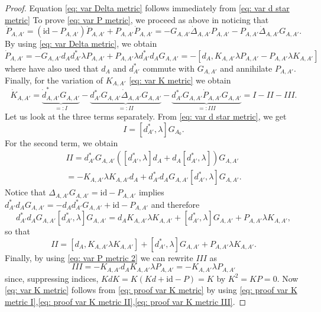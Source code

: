 \documentclass[11pt,a4paper]{amsart}
\theoremstyle{plain} %
\theoremstyle{definition}
\theoremstyle{remark}
\newcommand{\dd}{d}
\newcommand{\mr}{\mathrm}
\begin{document}
\begin{proof}
     Equation \eqref{eq: var Delta metric} follows immediately from \eqref{eq: var d star metric}
    To prove \eqref{eq: var P metric}, we proceed as above in noticing that 
    \begin{equation}
        \dot{P}_{A,A'} = (\mr{id}- P_{A,A'})\dot{P}_{A,A'} + P_{A,A'}\dot{P}_{A,A'} =  - G_{A,A'}\dot{\Delta}_{A,A'} P_{A,A'} - P_{A,A'}\dot{\Delta}_{A,A'}G_{A,A'}.
    \end{equation}
    By using \eqref{eq: var Delta metric}, we obtain 
    \begin{equation} \label{eq: var P metric 2}
        \dot{P}_{A,A'} = - G_{A,A'} \dd_A\dd^*_{A'}\lambda P_{A,A'} + P_{A,A'} \lambda \dd^*_{A'}\dd_AG_{A,A'} = - [\dd_A, K_{A,A'}\lambda P_{A,A'} - P_{A,A'}\lambda K_{A,A'}]
    \end{equation}
    where have also used that $\dd_A$ and $\dd^*_{A'}$ commute with $G_{A,A'}$ and annihilate $P_{A,A'}$. 
    Finally, for the variation of $K_{A,A'}$ \eqref{eq: var K metric}  we obtain 
    \begin{equation}
        \dot{K}_{A,A'} = \underbrace{\dot{d}^*_{A,A'}G_{A,A'}}_{=:I} - \underbrace{\dd^*_{A'}G_{A,A'}\dot{\Delta}_{A,A'}G_{A,A'}}_{=:II} -\underbrace{\dd^*_{A'}G_{A,A'}\dot{P}_{A,A'}G_{A,A'}}_{=:III} = I - II - III. \label{eq: proof var K metric}
    \end{equation}
    Let us look at the three terms separately. From \eqref{eq: var d star metric}, we get 
    \begin{equation}
        I = [\dd^*_{A'},\lambda] G_{A_{0}}. \label{eq: proof var K metric I}
    \end{equation}
    For the second term, we obtain
    \begin{multline}
        II = \dd^*_{A'}G_{A,A'}
        ([\dd^*_{A'},\lambda]\dd_A + \dd_A[\dd^*_{A'},\lambda])
        G_{A,A'} \\
        = -K_{A,A'}\lambda K_{A,A'}\dd_A + \dd^*_{A'}\dd_AG_{A,A'}[\dd^*_{A'},\lambda]G_{A,A'} \label{eq: proof var K metric II}.
    \end{multline}
    Notice that $\Delta_{A,A'}G_{A,A'} = \mr{id} - P_{A,A'}$ implies $\dd^*_{A'}\dd_AG_{A,A'} = - \dd_A\dd^*_{A'}G_{A,A'} + \mr{id} - P_{A,A'}$ and therefore 
    $$ \dd^*_{A'}\dd_AG_{A,A'}[\dd^*_{A'},\lambda]G_{A,A'}  = \dd_AK_{A,A'}\lambda K_{A,A'} + [\dd^*_{A'},\lambda]G_{A,A'} + P_{A,A'}\lambda K_{A,A'},$$ so that 
    \begin{equation}
        II= [\dd_A,K_{A,A'}\lambda K_{A,A'}] + [\dd^*_{A'},\lambda]G_{A,A'} + P_{A,A'}\lambda K_{A,A'}. 
    \end{equation}
    Finally, by using \eqref{eq: var P metric 2} we can rewrite $III$ as 
    \begin{equation}
        III = - K_{A,A'}\dd_AK_{A,A'}\lambda P_{A,A'} = -K_{A,A'}\lambda P_{A,A'} \label{eq: proof var K metric III}
    \end{equation}
    since, suppressing indices, $KdK = K (Kd + \mr{id} - P) = K$ by $K^2 = KP = 0$. Now \eqref{eq: var K metric} follows from \eqref{eq: proof var K metric} by using \eqref{eq: proof var K metric I},\eqref{eq: proof var K metric II},\eqref{eq: proof var K metric III}.
\end{proof}
\end{document}
